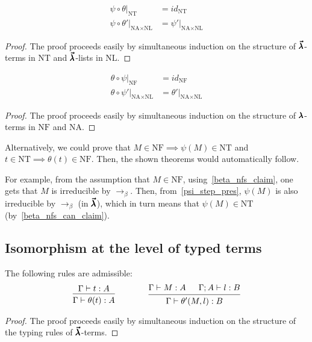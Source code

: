 \begin{theorem}
  \begin{align*}
    \psi \circ \theta |_{\text{NT}} &= id_{\text{NT}} \\
    \psi \circ \theta'|_{\text{NA} \times \text{NL}} &= \psi' |_{\text{NA} \times \text{NL}}
  \end{align*}
\end{theorem}
\begin{proof}
  The proof proceeds easily by simultaneous induction on the structure of $\pmb{\vec \lambda}$-terms in $\text{NT}$ and $\pmb{\vec \lambda}$-lists in $\text{NL}$.
\end{proof}

\begin{theorem}
  \begin{align*}
    \theta \circ \psi |_{\text{NF}} &= id_{\text{NF}} \\
    \theta \circ \psi'|_{\text{NA} \times \text{NL}} &= \theta' |_{\text{NA} \times \text{NL}}
  \end{align*}
\end{theorem}
\begin{proof}
  The proof proceeds easily by simultaneous induction on the structure of $\pmb{\lambda}$-terms in $\text{NF}$ and $\text{NA}$.
\end{proof}

Alternatively, we could prove that $M \in \text{NF} \implies \psi(M) \in \text{NT}$ and $t \in \text{NT} \implies \theta(t) \in \text{NF}$. Then, the shown theorems would automatically follow.

For example, from the assumption that $M \in \text{NF}$, using~\cref{beta_nfs_claim}, one gets that $M$ is irreducible by $\to_\beta$.
Then, from~\cref{psi_step_pres}, $\psi(M)$ is also irreducible by $\to_\beta$ (in $\pmb{\vec \lambda}$), which in turn means that $\psi(M) \in \text{NT}$ (by~\cref{beta_nfs_can_claim}).


\subsection{Isomorphism at the level of typed terms}

\begin{theorem}
  The following rules are admissible:
  \[ \begin{prooftree}
      \hypo{ \Gamma \vdash t : A }
      \infer1{ \Gamma \vdash \theta(t) : A } 
    \end{prooftree}
    \qquad \qquad
    \begin{prooftree}
      \hypo{ \Gamma \vdash M : A }
      \hypo{ \Gamma ; A \vdash l : B }
      \infer2{ \Gamma \vdash \theta'(M, l) : B }.
    \end{prooftree} \]
\end{theorem}
\begin{proof}
  The proof proceeds easily by simultaneous induction on the structure of the typing rules of $\pmb{\vec \lambda}$-terms.
\end{proof}

